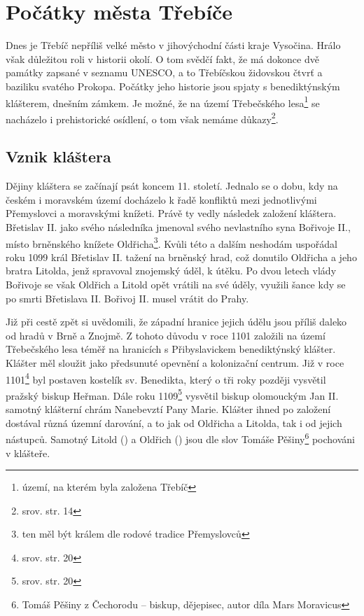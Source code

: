 \documentclass[a4paper,oneside,12pt]{report}
\begin{document}


\tableofcontents


\newpage



\setcounter{page}{1}

\chapter{Počátky města Třebíče}

Dnes je Třebíč nepříliš velké město v jihovýchodní části kraje Vysočina.
Hrálo však důležitou roli v historii okolí.
O tom svědčí fakt, že má dokonce dvě památky zapsané v seznamu UNESCO, a to Třebíčskou židovskou čtvrť a baziliku svatého Prokopa.
Počátky jeho historie jsou spjaty s benediktýnským klášterem, dnešním zámkem.
Je možné, že na území Třebečského lesa\footnote{území, na kterém byla založena Třebíč} se nacházelo i prehistorické osídlení, o tom však nemáme důkazy\footnote{srov.  str. 14}.

\section{Vznik kláštera}

Dějiny kláštera se začínají psát koncem 11. století.
Jednalo se o dobu, kdy na českém i moravském území docházelo k řadě konfliktů mezi jednotlivými Přemyslovci a moravskými knížeti. Právě ty vedly následek založení kláštera.
Břetislav II. jako svého následníka jmenoval svého nevlastního syna Bořivoje II., místo brněnského knížete Oldřicha\footnote{ten měl být králem dle rodové tradice Přemyslovců}.
Kvůli této a dalším neshodám uspořádal roku 1099 král Břetislav II. tažení na brněnský hrad, což donutilo Oldřicha a jeho bratra Litolda, jenž spravoval znojemský úděl, k útěku.
Po dvou letech vlády Bořivoje se však Oldřich a Litold opět vrátili na své úděly, využili šance kdy se po smrti Břetislava II. Bořivoj II. musel vrátit do Prahy.

Již při cestě zpět si uvědomili, že západní hranice jejich údělu jsou příliš daleko od hradů v Brně a Znojmě.
Z tohoto důvodu v roce 1101 založili na území Třebečského lesa téměř na hranicích s Přibyslavickem benediktýnský klášter.
Klášter měl sloužit jako předsunuté opevnění a kolonizační centrum.
Již v roce 1101\footnote{srov. \cite{Uhlir1978} str. 20} byl postaven kostelík sv. Benedikta, který o tři roky později vysvětil pražský biskup Heřman.
Dále roku 1109\footnote{srov. \cite{Uhlir1978} str. 20} vysvětil biskup olomouckým Jan II. samotný klášterní chrám Nanebevztí Pany Marie.
Klášter ihned po založení dostával různá územní darování, a to jak od Oldřicha a Litolda, tak i od jejich nástupců.
Samotný Litold () a Oldřich () jsou dle slov Tomáše Pěšiny\footnote{Tomáš Pěšiny z Čechorodu -- biskup, dějepisec, autor díla Mars Moravicus} pochováni v klášteře.
\end{document}
